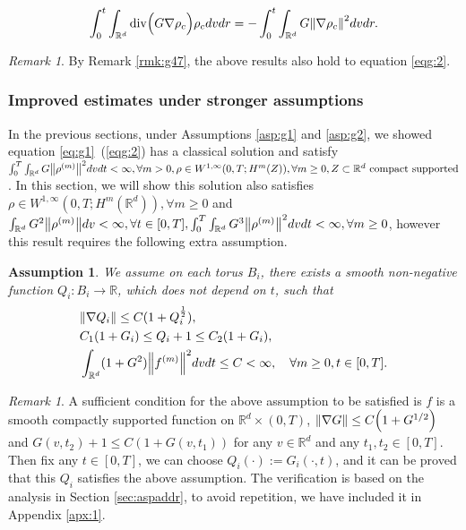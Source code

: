 \documentclass[a4paper, 11pt]{article}
\newcounter{results}[section]
\theoremstyle{plain}
\newtheorem{assumption}[results]{Assumption}
\theoremstyle{remark}
\newtheorem{remark}[results]{Remark}
\theoremstyle{definition}
\renewcommand{\div}{\mathrm{div}}
\newcommand{\intd}{\int_{\mathbb{R}^d}}
\newcommand{\intt}{\int_0^T}
\newcommand{\J}{\boldsymbol{J}}
\begin{document}
\begin{equation}
    \int_0^t\intd \div\Big(G\nabla\rho_c\Big)\rho_c dvdr=-\int_0^t\intd G\norm{\nabla\rho_c}^2dvdr.
\end{equation}
\begin{remark}\label{rmk:g95}
By Remark \ref{rmk:g47}, the above results also hold to equation \eqref{eqg:2}.
\end{remark}

\subsubsection{Improved estimates under stronger assumptions}
In the previous sections, under Assumptions \ref{asp:g1} and \ref{asp:g2}, we showed equation \eqref{eq:g1}~(\eqref{eqg:2}) has a classical solution and satisfy $\intt\intd G\norm{\rho^{(m)}}^2dvdt<\infty,\forall m>0, \rho\in W^{1,\infty}(0,T;H^m(Z)),\forall m\geq 0, Z\subset\mathbb{R}^d\text{ compact supported}$. In this section, we will show this solution also satisfies $\rho\in W^{1,\infty}(0,T;H^m(\mathbb{R}^d)),\forall m\geq 0$ and $\intd G^2\norm{\rho^{(m)}}dv<\infty,\forall t\in [0,T], \intt\intd G^3\norm{\rho^{(m)}}^2dvdt<\infty,\forall m\geq 0$, however this result requires the following extra assumption.

\begin{assumption}\label{asp:g3}
   We assume on each torus $B_i$, there exists a smooth non-negative function $Q_i:B_i\to \mathbb{R}$, which does not depend on $t$, such that 
   \begin{eqnarray}
       &\norm{\nabla Q_i}\leq C(1+Q_i^{\frac{1}{2}}),\\
        &C_1(1+G_i)\leq Q_i+1\leq C_2(1+G_i),\\
        &\intd (1+G^2)\norm{f^{(m)}}^2dvdt\leq C<\infty,\quad \forall m\geq 0, t\in [0,T].
   \end{eqnarray}
\end{assumption}
\begin{remark}\label{rmke:g211}
    A sufficient condition for the above assumption to be satisfied is $f$ is a smooth compactly supported function on $\mathbb{R}^d\times (0,T)$, $\norm{\nabla G}\leq C\Big(1+G^{1/2}\Big)$ and $ G(v,t_2)+1\leq C(1+G(v,t_1))$ for any $v\in \mathbb{R}^d$ and any $t_1,t_2\in [0,T]$. Then fix any $t\in [0,T]$, we can choose $Q_i(\cdot):=G_i(\cdot,t)$, and it can be proved that this $Q_i$ satisfies the above assumption. The verification is based on the analysis in Section \ref{sec:aspaddr}, to avoid repetition, we have included it in Appendix \ref{apx:1}.
\end{remark}
\end{document}

